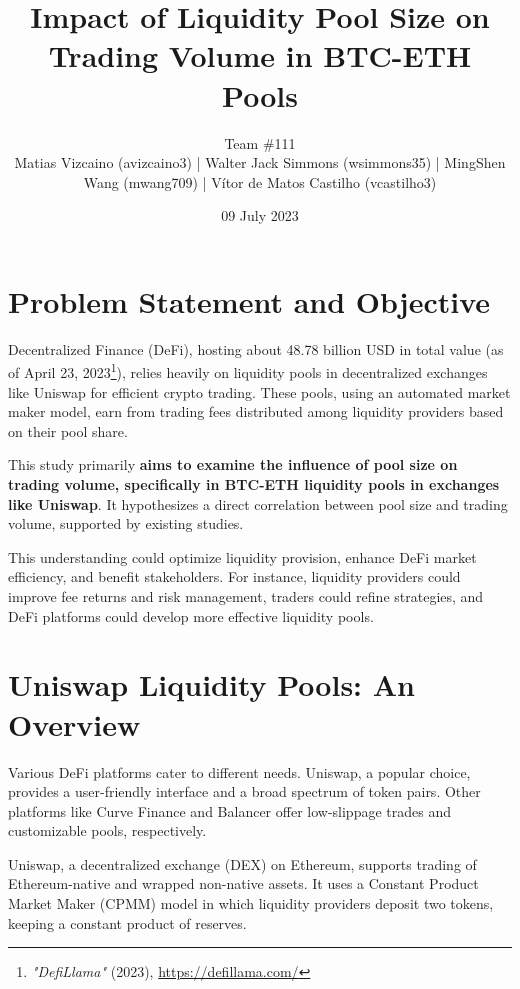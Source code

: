\documentclass{article}
\makeatletter
\renewcommand{\maketitle}{\bgroup\setlength{\parindent}{0pt}
\begin{center} %
  \Large\@title
  \newline
  \footnotesize\@author
\end{center}
\begin{flushright}
  \@date
\end{flushright}
\egroup}
\makeatother
\begin{document}
\title{Impact of Liquidity Pool Size on Trading Volume in BTC-ETH Pools}
\author{
  Team \#111 \\
   \scriptsize Matias Vizcaino (avizcaino3) | Walter Jack Simmons (wsimmons35) | MingShen Wang (mwang709) | Vítor de Matos Castilho (vcastilho3)
}
\date{09 July 2023}
\maketitle



\noindent
{\setlength{\tabcolsep}{4pt} %

\section*{\textbf{Problem Statement and Objective}}

Decentralized Finance (DeFi), hosting about 48.78 billion USD in total value (as of April 23, 2023\footnote{\textit{"DefiLlama"} (2023), \url{https://defillama.com/}}), relies heavily on liquidity pools in decentralized exchanges like Uniswap for efficient crypto trading. These pools, using an automated market maker model, earn from trading fees distributed among liquidity providers based on their pool share.

This study primarily \textbf{aims to examine the influence of pool size on trading volume, specifically in BTC-ETH liquidity pools in exchanges like Uniswap}. It hypothesizes a direct correlation between pool size and trading volume, supported by existing studies. 

This understanding could optimize liquidity provision, enhance DeFi market efficiency, and benefit stakeholders. For instance, liquidity providers could improve fee returns and risk management, traders could refine strategies, and DeFi platforms could develop more effective liquidity pools.

\section*{\textbf{Uniswap Liquidity Pools: An Overview}}

Various DeFi platforms cater to different needs. Uniswap, a popular choice, provides a user-friendly interface and a broad spectrum of token pairs. Other platforms like Curve Finance and Balancer offer low-slippage trades and customizable pools, respectively.

Uniswap, a decentralized exchange (DEX) on Ethereum, supports trading of Ethereum-native and wrapped non-native assets. It uses a Constant Product Market Maker (CPMM) model in which liquidity providers deposit two tokens, keeping a constant product of reserves.

}
\end{document}
